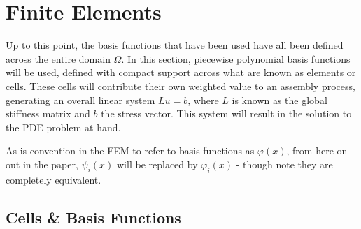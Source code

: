 \section{Finite Elements}

Up to this point, the basis functions that have been used have all been defined across the entire domain $\Omega$. In this section, piecewise polynomial basis functions will be used, defined with compact support across what are known as elements or cells. These cells will contribute their own weighted value to an assembly process, generating an overall linear system $Lu = b$, where $L$ is known as the global stiffness matrix and $b$ the stress vector. This system will result in the solution to the PDE problem at hand.

\begin{remark}
	As is convention in the FEM to refer to basis functions as $\varphi(x)$, from here on out in the paper, $\psi_i(x)$ will be replaced by $\varphi_i(x)$ - though note they are completely equivalent.
\end{remark}

\subsection{Cells \& Basis Functions}

